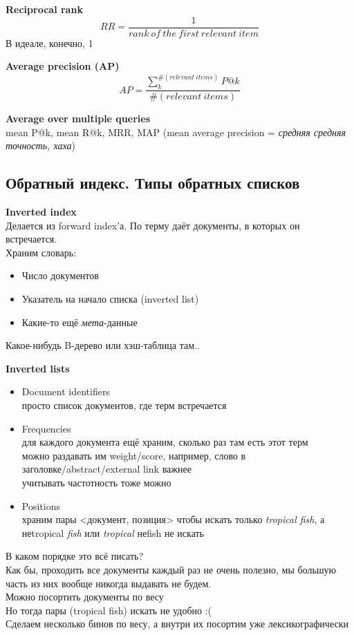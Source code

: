 \documentclass[12pt]{article}
\begin{document}
    \smallskip
    {\bf Reciprocal rank}
    $$RR = \frac{1}{rank~of~the~first~relevant~item}$$
    В идеале, конечно, 1

    \smallskip \smallskip
    {\bf Average precision (AP)}
    $$AP = \frac{\sum_{k}^{\#(relevant~items)} P@k}{\#(relevant~items)}$$

    \smallskip \smallskip
    {\bf Average over multiple queries}\\
    mean P@k, mean R@k, MRR, MAP (mean average precision = \textit{средняя средняя точность, хаха})
    \pagebreak
  \subsection{Обратный индекс. Типы обратных списков}
    {\bf Inverted index}\\
    Делается из forward index'а. По терму даёт документы, в которых он встречается.\\
    Храним словарь:
      \begin{itemize}
          \item Число документов
          \item Указатель на начало списка (inverted list)
          \item Какие-то ещё \textit{мета}-данные
      \end{itemize}
    Какое-нибудь B-дерево или хэш-таблица там..

    \smallskip
  {\bf Inverted lists}
    \begin{itemize}
        \item Document identifiers\\
          просто список документов, где терм встречается
        \item Frequencies\\
          для каждого документа ещё храним, сколько раз там есть этот терм\\
          можно раздавать им weight/score, например, слово в заголовке/abstract/external link важнее\\
          учитывать частотность тоже можно
        \item Positions\\
        храним пары <документ, позиция>
        чтобы искать только \textit{tropical fish}, а неtropical \textit{fish} или \textit{tropical} неfish не искать
    \end{itemize}
    В каком порядке это всё писать?\\
    Как бы, проходить все документы каждый раз не очень полезно, мы большую часть из них вообще никогда выдавать не будем.\\
    Можно посортить документы по весу\\
    Но тогда пары (tropical fish) искать не удобно :(\\
    Сделаем несколько бинов по весу, а внутри их посортим уже лексикографически
\end{document}
